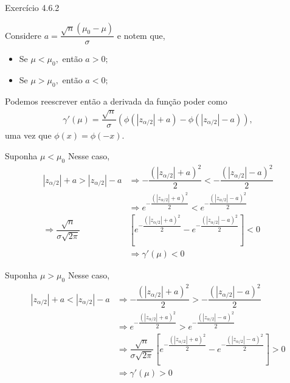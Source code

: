 \documentclass[12pt]{beamer}
\begin{document}
\begin{frame}{Exercício 4.6.2}
\begin{block}{}
\justifying
Considere $a=\dfrac{\sqrt{n}(\mu_0 - \mu)}{\sigma}$ e notem que,
\begin{itemize}
    \item Se $\mu<\mu_{0},$ então $a>0;$
    \pause
    \item Se $\mu>\mu_{0},$ então $a<0;$
\end{itemize}
\end{block}
\pause 
\begin{block}{}
\justifying
Podemos reescrever então a derivada da função poder como
\begin{align*}
\gamma'(\mu) = \dfrac{\sqrt{n}}{\sigma} \left(\phi\left( |z_{\alpha/2}|+a\right) - \phi\left(|z_{\alpha/2}|-a\right)\right),
\end{align*}
uma vez que $\phi(x)=\phi(-x).$ 
\end{block}
\end{frame}

\begin{frame}{}
\begin{block}{Suponha $\mu<\mu_{0}$}
\justifying
Nesse caso, 
\begin{align*}
    |z_{\alpha/2}|+a>|z_{\alpha/2}|-a&\Rightarrow -\dfrac{(|z_{\alpha/2}|+a)^{2}}{2}<-\dfrac{(|z_{\alpha/2}|-a)^{2}}{2}\\
    &\Rightarrow e^{-\dfrac{(|z_{\alpha/2}|+a)^{2}}{2}} < e^{-\dfrac{(|z_{\alpha/2}|-a)^{2}}{2}}\\
\Rightarrow   \dfrac{\sqrt{n}}{\sigma\sqrt{2\pi}} & \left[e^{-\dfrac{(|z_{\alpha/2}|+a)^{2}}{2}}-e^{-\dfrac{(|z_{\alpha/2}|-a)^{2}}{2}}\right]<0\\
    &\Rightarrow \gamma'(\mu)<0
\end{align*}
\end{block}
\end{frame}


\begin{frame}{}
\begin{block}{Suponha $\mu>\mu_{0}$}
\justifying
Nesse caso, 
\begin{align*}
    |z_{\alpha/2}|+a<|z_{\alpha/2}|-a&\Rightarrow -\dfrac{(|z_{\alpha/2}|+a)^{2}}{2}>-\dfrac{(|z_{\alpha/2}|-a)^{2}}{2}\\
    &\Rightarrow e^{-\dfrac{(|z_{\alpha/2}|+a)^{2}}{2}} > e^{-\dfrac{(|z_{\alpha/2}|-a)^{2}}{2}}\\
    &\Rightarrow \dfrac{\sqrt{n}}{\sigma\sqrt{2\pi}}\left[e^{-\dfrac{(|z_{\alpha/2}|+a)^{2}}{2}}-e^{-\dfrac{(|z_{\alpha/2}|-a)^{2}}{2}}\right]>0\\
    &\Rightarrow \gamma'(\mu)>0
\end{align*}
\end{block}
\end{frame}
\end{document}
